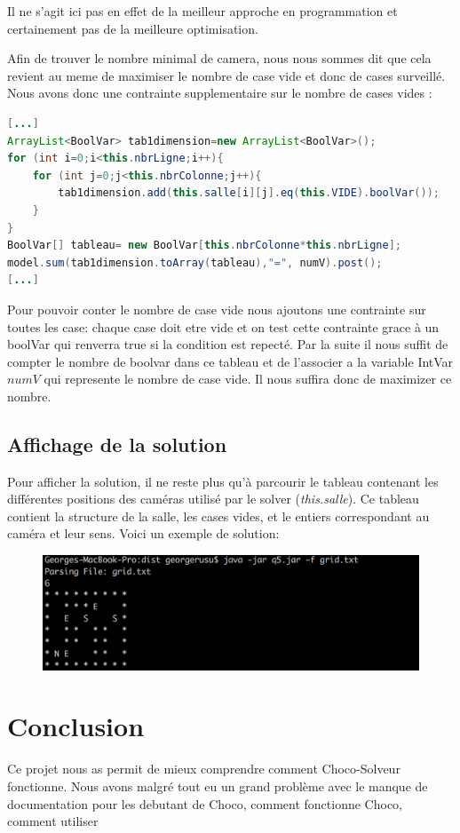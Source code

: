 \documentclass[a4paper,10pt]{article}
\begin{document}
Il ne s'agit ici pas en effet de la meilleur approche en programmation et certainement pas de la meilleure optimisation.

Afin de trouver le nombre minimal de camera, nous nous sommes dit que cela revient au meme de maximiser le nombre de case vide et donc de cases surveillé. Nous avons donc une contrainte supplementaire sur le nombre de cases vides :
\begin{lstlisting}[language=Java,basicstyle=\tiny]
[...]
ArrayList<BoolVar> tab1dimension=new ArrayList<BoolVar>();
for (int i=0;i<this.nbrLigne;i++){
	for (int j=0;j<this.nbrColonne;j++){
		tab1dimension.add(this.salle[i][j].eq(this.VIDE).boolVar());
	}
}
BoolVar[] tableau= new BoolVar[this.nbrColonne*this.nbrLigne];
model.sum(tab1dimension.toArray(tableau),"=", numV).post();
[...]
\end{lstlisting}
Pour pouvoir conter le nombre de case vide nous ajoutons une contrainte sur toutes les case: chaque case doit etre vide et on test cette contrainte grace à un boolVar qui renverra true si la condition est repecté. Par la suite il nous suffit de compter le nombre de boolvar dans ce tableau et de l'associer a la variable IntVar $numV$ qui represente le nombre de case vide. Il nous suffira donc de maximizer ce nombre.

\subsection{Affichage de la solution}
\par Pour afficher la solution, il ne reste plus qu'à parcourir le tableau contenant les différentes positions des caméras utilisé par le solver (\emph{this.salle}).  Ce tableau contient la structure de la salle, les cases vides, et le entiers correspondant au caméra et leur sens. Voici un exemple de solution:
\begin{figure}[!h]
\includegraphics[width=450px]{img/q5.png}
\end{figure}

\section{Conclusion}
Ce projet nous as permit de mieux comprendre comment Choco-Solveur fonctionne. Nous avons malgré tout eu un grand problème avec le manque de documentation pour les debutant de Choco, comment fonctionne Choco, comment utiliser
\end{document}
